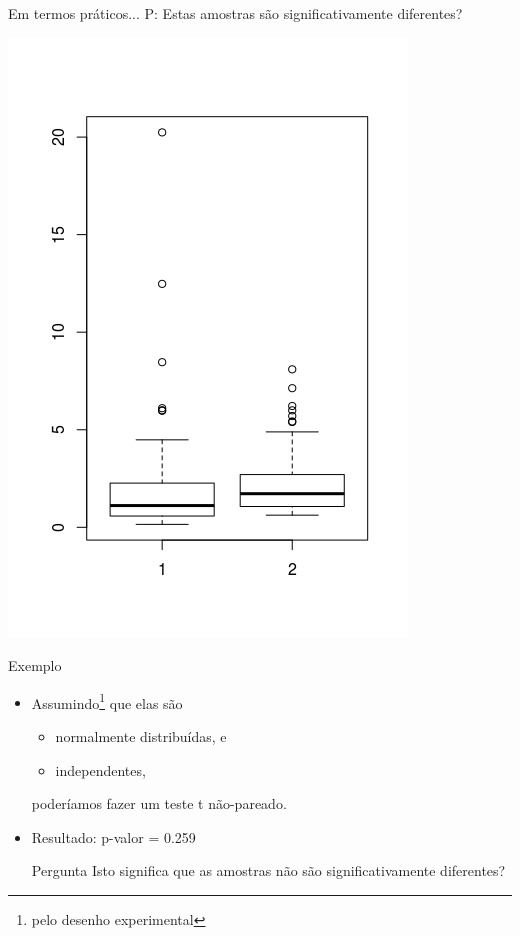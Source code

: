 \documentclass{beamer}
\begin{document}
\begin{frame}{Em termos práticos...}
P: Estas amostras são significativamente diferentes?

  \centering
  \includegraphics[height=\textheight]{Nao_Param/2samples-bp}
\end{frame}

\begin{frame}{Exemplo}
  \begin{itemize}
  \item<1-> Assumindo\footnote{pelo desenho experimental} que elas são
    \begin{itemize}
    \item<1-> \alert<3>{normalmente distribuídas}, e
    \item<1-> independentes,
    \end{itemize}
poderíamos fazer um teste t não-pareado.

  \item<2-> Resultado: p-valor = \alert{0.259}
  \begin{block}{Pergunta}
    Isto significa que as amostras não são significativamente diferentes?
  \end{block}
  \end{itemize}
\end{frame}
\end{document}

